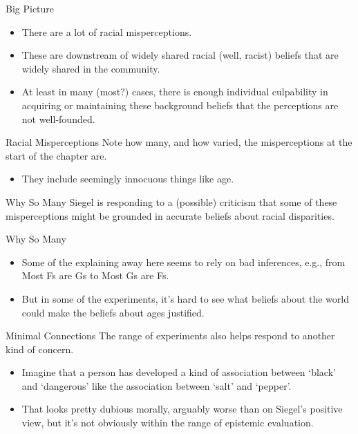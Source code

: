 \documentclass[
  17pt,
  letterpaper,
  ignorenonframetext,
  aspectratio=169,
  handout,
  xcolor={dvipsnames}]{beamer}
\providecommand{\tightlist}{%
  \setlength{\itemsep}{0pt}\setlength{\parskip}{0pt}}\usepackage{longtable,booktabs,array}
\begin{document}
\begin{frame}{Big Picture}
\protect\hypertarget{big-picture}{}
\begin{itemize}[<+->]
\tightlist
\item
  There are a lot of racial misperceptions.
\item
  These are downstream of widely shared racial (well, racist) beliefs
  that are widely shared in the community.
\item
  At least in many (most?) cases, there is enough individual culpability
  in acquiring or maintaining these background beliefs that the
  perceptions are not well-founded.
\end{itemize}
\end{frame}

\begin{frame}{Racial Misperceptions}
\protect\hypertarget{racial-misperceptions-1}{}
Note how many, and how varied, the misperceptions at the start of the
chapter are.

\begin{itemize}[<+->]
\tightlist
\item
  They include seemingly innocuous things like age.
\end{itemize}
\end{frame}

\begin{frame}{Why So Many}
\protect\hypertarget{why-so-many}{}
Siegel is responding to a (possible) criticism that some of these
misperceptions might be grounded in accurate beliefs about racial
disparities.
\end{frame}

\begin{frame}{Why So Many}
\protect\hypertarget{why-so-many-1}{}
\begin{itemize}[<+->]
\tightlist
\item
  Some of the explaining away here seems to rely on bad inferences,
  e.g., from Most Fs are Gs to Most Gs are Fs.
\item
  But in some of the experiments, it's hard to see what beliefs about
  the world could make the beliefs about ages justified.
\end{itemize}
\end{frame}

\begin{frame}{Minimal Connections}
\protect\hypertarget{minimal-connections}{}
The range of experiments also helps respond to another kind of concern.

\begin{itemize}[<+->]
\tightlist
\item
  Imagine that a person has developed a kind of association between
  `black' and `dangerous' like the association between `salt' and
  `pepper'.
\item
  That looks pretty dubious morally, arguably worse than on Siegel's
  positive view, but it's not obviously within the range of epistemic
  evaluation.
\end{itemize}
\end{frame}
\end{document}
